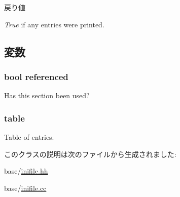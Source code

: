 \begin{DoxyRetVals}{戻り値}
\item[{\em True}]if any entries were printed. \end{DoxyRetVals}


\subsection{変数}
\hypertarget{classIniFile_1_1Section_a591be5ec02bb1171f1edde9acdbcfc50}{
\subsubsection[{referenced}]{\setlength{\rightskip}{0pt plus 5cm}bool {\bf referenced}}}
\label{classIniFile_1_1Section_a591be5ec02bb1171f1edde9acdbcfc50}


Has this section been used? \hypertarget{classIniFile_1_1Section_a064a83514d9112677d600fdf61cb9ad0}{
\subsubsection[{table}]{ {\bf table}}}
\label{classIniFile_1_1Section_a064a83514d9112677d600fdf61cb9ad0}


Table of entries. 

このクラスの説明は次のファイルから生成されました:\begin{DoxyCompactItemize}
\item 
base/\hyperlink{inifile_8hh}{inifile.hh}\item 
base/\hyperlink{inifile_8cc}{inifile.cc}\end{DoxyCompactItemize}
